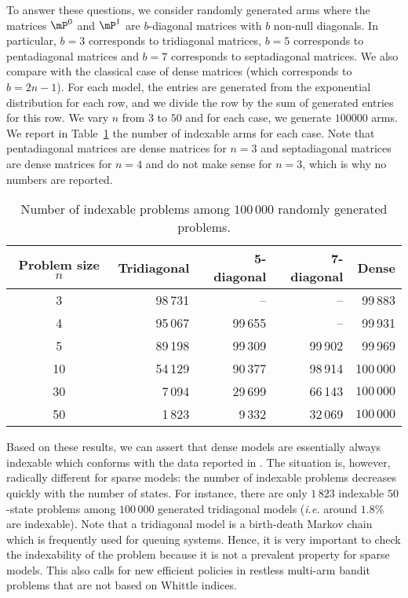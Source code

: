 To answer these questions, we consider randomly generated arms where the matrices $\mP^0$ and $\mP^1$ are $b$-diagonal matrices with $b$  non-null diagonals. In particular, $b=3$ corresponds to tridiagonal matrices, $b=5$ corresponds to pentadiagonal matrices and $b=7$ corresponds to septadiagonal matrices. We also compare with the classical case of dense matrices (which corresponds to $b=2n-1$).  For each model, the entries are generated from the exponential distribution for each row, and we divide the row by the sum of generated entries for this row.   We vary $n$ from $3$ to $50$ and for each case, we generate $100000$ arms. We report in Table~\ref{tb:number_indexable} the number of indexable arms for each case. Note that pentadiagonal matrices are dense matrices for $n=3$ and septadiagonal matrices are dense matrices for $n=4$ and do not make sense for $n=3$, which is why no numbers are reported.

\begin{table}[ht]
    \caption{Number of indexable problems among $100\,000$ randomly generated problems.}
    \centering
    \label{tb:number_indexable}
    \begin{tabular}{|c|r|r|r|r|}
        \hline
        Problem size $n$ &  Tridiagonal &  5-diagonal &  7-diagonal &  Dense \\
        \hline
        3  &     98\,731 &        -- &        -- &   99\,883 \\
        4  &     95\,067 &     99\,655 &        -- &   99\,931 \\
        5  &     89\,198 &     99\,309 &     99\,902 &   99\,969 \\
        10 &     54\,129 &     90\,377 &     98\,914 &  100\,000 \\
        30 &      7\,094 &     29\,699 &     66\,143 &  $100\,000$ \\
        50 &      1\,823 &      9\,332 &     32\,069 &  $100\,000$ \\
        \hline
    \end{tabular}
\end{table}

Based on these results, we can assert that dense models are essentially always indexable which conforms with the data reported in \cite{nino2007dynamic}. The situation is, however, radically different for sparse models: the number of indexable problems decreases quickly with the number of states. For instance, there are only $1\,823$ indexable $50$-state problems among $100\,000$ generated tridiagonal models (\emph{i.e.} around $1.8\%$ are indexable). Note that a tridiagonal model is a birth-death Markov chain which is frequently used for queuing systems. Hence, it is very important to check the indexability of the problem because it is not a prevalent property for sparse models. This also calls for new efficient policies in restless multi-arm bandit problems that are not based on Whittle indices.

